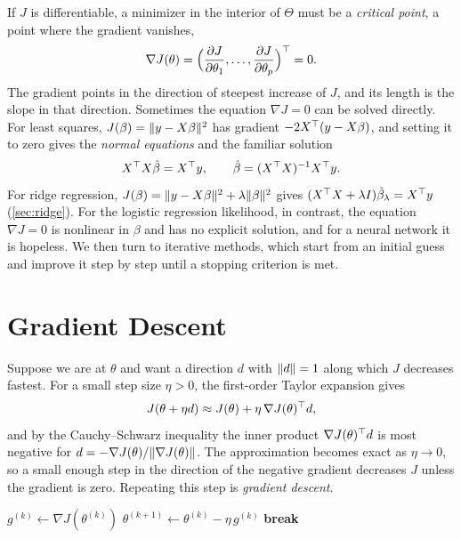 If $J$ is differentiable, a minimizer in the interior of $\Theta$ must be a \emph{critical point}, a point where the gradient vanishes,
\[
\nabla J(\theta)=\Big(\frac{\partial J}{\partial\theta_1},\dots,\frac{\partial J}{\partial\theta_p}\Big)^{\top}=0.
\]
The gradient points in the direction of steepest increase of $J$, and its length is the slope in that direction. Sometimes the equation $\nabla J=0$ can be solved directly. For least squares, $J(\beta)=\lVert y-X\beta\rVert^2$ has gradient $-2X^{\top}(y-X\beta)$, and setting it to zero gives the \emph{normal equations} and the familiar solution
\[
X^{\top} X\hat\beta=X^{\top} y,\qquad \hat\beta=(X^{\top} X)^{-1}X^{\top} y.
\]
For ridge regression, $J(\beta)=\lVert y-X\beta\rVert^2+\lambda\lVert \beta\rVert^2$ gives $(X^{\top} X+\lambda I)\hat\beta_\lambda=X^{\top} y$ (\cref{sec:ridge}). For the logistic regression likelihood, in contrast, the equation $\nabla J=0$ is nonlinear in $\beta$ and has no explicit solution, and for a neural network it is hopeless. We then turn to iterative methods, which start from an initial guess and improve it step by step until a stopping criterion is met.

\section{Gradient Descent}\label{sec:gd}

Suppose we are at $\theta$ and want a direction $d$ with $\lVert d\rVert=1$ along which $J$ decreases fastest. For a small step size $\eta>0$, the first-order Taylor expansion gives
\[
J(\theta+\eta d)\approx J(\theta)+\eta\,\nabla J(\theta)^{\top} d,
\]
and by the Cauchy--Schwarz inequality the inner product $\nabla J(\theta)^{\top} d$ is most negative for $d=-\nabla J(\theta)/\lVert \nabla J(\theta)\rVert$. The approximation becomes exact as $\eta\to0$, so a small enough step in the direction of the negative gradient decreases $J$ unless the gradient is zero. Repeating this step is \emph{gradient descent}.

\begin{algorithm}[H]
\caption{Gradient Descent (GD)}\label{alg:gd}
\begin{algorithmic}[1]
  \State $g^{(k)}\gets\nabla J(\theta^{(k)})$
  \State $\theta^{(k+1)}\gets\theta^{(k)}-\eta\,g^{(k)}$ 
    \State \textbf{break}
  \EndIf
\EndFor
{}
\end{algorithmic}
\end{algorithm}


